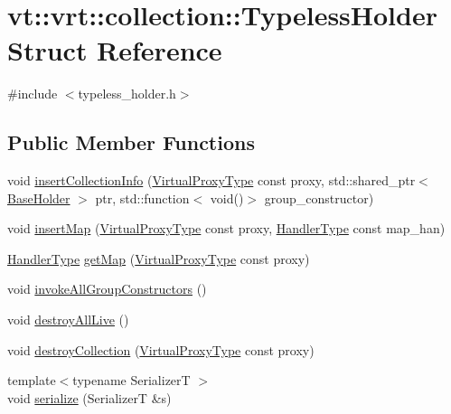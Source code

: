 \hypertarget{structvt_1_1vrt_1_1collection_1_1_typeless_holder}{}\section{vt\+:\+:vrt\+:\+:collection\+:\+:Typeless\+Holder Struct Reference}
\label{structvt_1_1vrt_1_1collection_1_1_typeless_holder}


{\ttfamily \#include $<$typeless\+\_\+holder.\+h$>$}

\subsection*{Public Member Functions}
\begin{DoxyCompactItemize}
\item 
void \hyperlink{structvt_1_1vrt_1_1collection_1_1_typeless_holder_ab78575e90b9de2650b0e4e11d138a2bc}{insert\+Collection\+Info} (\hyperlink{namespacevt_a1b417dd5d684f045bb58a0ede70045ac}{Virtual\+Proxy\+Type} const proxy, std\+::shared\+\_\+ptr$<$ \hyperlink{structvt_1_1vrt_1_1collection_1_1_base_holder}{Base\+Holder} $>$ ptr, std\+::function$<$ void()$>$ group\+\_\+constructor)
\item 
void \hyperlink{structvt_1_1vrt_1_1collection_1_1_typeless_holder_a10484ae97f0d9cf0011e746806a89481}{insert\+Map} (\hyperlink{namespacevt_a1b417dd5d684f045bb58a0ede70045ac}{Virtual\+Proxy\+Type} const proxy, \hyperlink{namespacevt_af64846b57dfcaf104da3ef6967917573}{Handler\+Type} const map\+\_\+han)
\item 
\hyperlink{namespacevt_af64846b57dfcaf104da3ef6967917573}{Handler\+Type} \hyperlink{structvt_1_1vrt_1_1collection_1_1_typeless_holder_a0f3c1ebd1441f70b896aedfa7a9cf0a0}{get\+Map} (\hyperlink{namespacevt_a1b417dd5d684f045bb58a0ede70045ac}{Virtual\+Proxy\+Type} const proxy)
\item 
void \hyperlink{structvt_1_1vrt_1_1collection_1_1_typeless_holder_aa2c47fe8c1047b336e4ff000a7523bfa}{invoke\+All\+Group\+Constructors} ()
\item 
void \hyperlink{structvt_1_1vrt_1_1collection_1_1_typeless_holder_af968b98622d1d81888d8667a94e5950d}{destroy\+All\+Live} ()
\item 
void \hyperlink{structvt_1_1vrt_1_1collection_1_1_typeless_holder_a79330546a2110fe7d7b6bdd2929db2de}{destroy\+Collection} (\hyperlink{namespacevt_a1b417dd5d684f045bb58a0ede70045ac}{Virtual\+Proxy\+Type} const proxy)
\item 
{\footnotesize template$<$typename SerializerT $>$ }\\void \hyperlink{structvt_1_1vrt_1_1collection_1_1_typeless_holder_a812cc4810b97976daed2317dc1c227f9}{serialize} (SerializerT \&s)
\end{DoxyCompactItemize}
